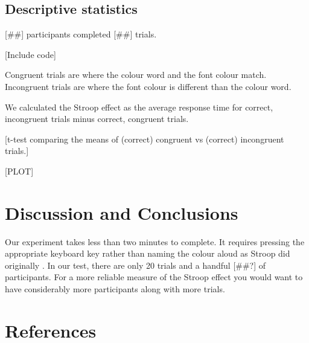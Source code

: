 \documentclass{article}
\begin{document}
\subsection{Descriptive statistics}
\label{sec:orgc55d288}
[\#\#] participants completed [\#\#] trials.


[Include code]

Congruent trials are where the colour word and the font colour match. Incongruent trials are where the font colour is different than the colour word.


We calculated the Stroop effect as the average response time for correct, incongruent trials minus correct, congruent trials.

[t-test comparing the means of (correct) congruent vs (correct) incongruent trials.]

[PLOT]

\section{Discussion and Conclusions}
\label{sec:org4708dc6}

Our experiment takes less than two minutes to complete. It requires pressing the appropriate keyboard key rather than naming the colour aloud as Stroop did originally \cite{Stroop1935}. In our test, there are only 20 trials and a handful [\#\#?] of participants. For a more reliable measure of the Stroop effect you would want to have considerably more participants along with more trials.

\section{References}
\label{sec:org04d326f}


\end{document}
